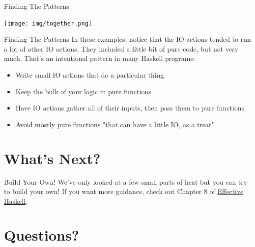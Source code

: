 \documentclass[10pt, presentation, colorlinks]{beamer}
\begin{document}
\begin{frame}[label={sec:org12b80ae}]{Finding The Patterns}
\begin{center}
\texttt{[image: img/together.png]}
\end{center}
\end{frame}

\begin{frame}[label={sec:org59ea1ae}]{Finding The Patterns}
In these examples, notice that the IO actions tended to run a lot of
other IO actions. They included a little bit of pure code, but not
very much. That's an intentional pattern in many Haskell programs:

\bigskip

\begin{itemize}
\item Write small IO actions that do a particular thing
\item Keep the bulk of your logic in pure functions
\item Have IO actions gather all of their inputs, then pass them to pure functions.
\item Avoid mostly pure functions "that can have a little IO, as a treat"
\end{itemize}
\end{frame}

\section{What's Next?}
\label{sec:orgbba19a2}

\begin{frame}[label={sec:org11f08d9}]{Build Your Own!}
We've only looked at a few small parts of \alert{hcat} but you can try to
build your own! If you want more guidance, check out Chapter 8 of
\uline{Effective Haskell}.
\end{frame}

\section{Questions?}
\label{sec:orge7d2c04}
\end{document}
